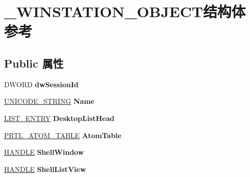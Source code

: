 \hypertarget{struct___w_i_n_s_t_a_t_i_o_n___o_b_j_e_c_t}{}\section{\+\_\+\+W\+I\+N\+S\+T\+A\+T\+I\+O\+N\+\_\+\+O\+B\+J\+E\+C\+T结构体 参考}
\label{struct___w_i_n_s_t_a_t_i_o_n___o_b_j_e_c_t}
\subsection*{Public 属性}
\begin{DoxyCompactItemize}
\item 
\mbox{\label{struct___w_i_n_s_t_a_t_i_o_n___o_b_j_e_c_t_a47b0405e0371d09dd966a1374ba0b2db}} 
D\+W\+O\+RD {\bfseries dw\+Session\+Id}
\item 
\mbox{\label{struct___w_i_n_s_t_a_t_i_o_n___o_b_j_e_c_t_ad79623d70104867a38c7dfe3a34e4659}} 
\hyperlink{struct___u_n_i_c_o_d_e___s_t_r_i_n_g}{U\+N\+I\+C\+O\+D\+E\+\_\+\+S\+T\+R\+I\+NG} {\bfseries Name}
\item 
\mbox{\label{struct___w_i_n_s_t_a_t_i_o_n___o_b_j_e_c_t_ae3de5728969098a6dadea6acd958654f}} 
\hyperlink{struct___l_i_s_t___e_n_t_r_y}{L\+I\+S\+T\+\_\+\+E\+N\+T\+RY} {\bfseries Desktop\+List\+Head}
\item 
\mbox{\label{struct___w_i_n_s_t_a_t_i_o_n___o_b_j_e_c_t_ad378de33f72ad28074fc7dbbbb556c90}} 
\hyperlink{struct___r_t_l___a_t_o_m___t_a_b_l_e}{P\+R\+T\+L\+\_\+\+A\+T\+O\+M\+\_\+\+T\+A\+B\+LE} {\bfseries Atom\+Table}
\item 
\mbox{\label{struct___w_i_n_s_t_a_t_i_o_n___o_b_j_e_c_t_a8618bbe5716a4284cdd282d85e0474f4}} 
\hyperlink{interfacevoid}{H\+A\+N\+D\+LE} {\bfseries Shell\+Window}
\item 
\mbox{\label{struct___w_i_n_s_t_a_t_i_o_n___o_b_j_e_c_t_a6c2f6e60414604074527313385d8689d}} 
\hyperlink{interfacevoid}{H\+A\+N\+D\+LE} {\bfseries Shell\+List\+View}

\end{DoxyCompactItemize}
